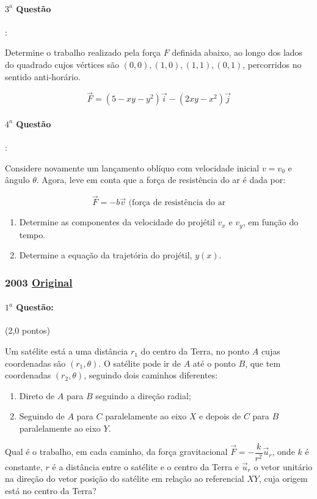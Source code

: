 \documentclass[12pt,a4paper]{article}
\newcommand{\original}[1]{\tiny \href{#1}{Original} \normalsize}
\begin{document}
\paragraph{$3^a$ Questão}:

Determine o trabalho realizado pela força $F$ definida abaixo, ao longo dos lados do quadrado cujos vértices são $(0,0),(1,0),(1,1),(0,1)$, percorridos no sentido anti-horário.

$$ \overrightarrow{F}= (5-xy-y^2)\overrightarrow{i}-(2xy-x^2)\overrightarrow{j}$$

\paragraph{$4^a$ Questão}:

Considere novamente um lançamento oblíquo com velocidade inicial $v=v_0$ e ângulo $\theta$. Agora, leve em conta que a força de resistência do ar é dada por:

$$ \overrightarrow{F}=-b\overrightarrow{v} \textrm{ (força de resistência do ar} $$

\begin{enumerate}[label=\alph*)]
\item Determine as componentes da velocidade do projétil $v_x$ e $v_y$, em função do tempo.
\item Determine a equação da trajetória do projétil, $y(x)$.
\end{enumerate}
\newpage

\subsubsection{2003 \original{https://drive.google.com/file/d/1DHYVV8VAxas7WYdZjn7KfkgFQ6bv0rQq/view?usp=sharing}}

\paragraph{$1^a$ Questão:} (2,0 pontos)

Um satélite está a uma distância $r_1$ do centro da Terra, no ponto $A$ cujas coordenadas são $(r_1,\theta)$. O satélite
pode ir de $A$ até o ponto $B$, que tem coordenadas $(r_2,\theta)$, seguindo dois caminhos diferentes:
\begin{enumerate}[label=\roman*)]
\item Direto de $A$ para $B$ seguindo a direção radial;
\item Seguindo de $A$ para $C$ paralelamente ao eixo $X$ e depois de $C$ para $B$ paralelamente ao eixo $Y$.  
\end{enumerate}
Qual é o trabalho, em cada caminho, da força gravitacional $\overrightarrow{F}=-\dfrac{k}{r^2}\overrightarrow{u}_r$, onde 
$k$ é constante, $r$ é a distância entre o satélite e o centro da Terra e $\overrightarrow{u}_r$ o vetor unitário na direção 
do vetor posição do satélite em relação ao referencial $XY$, cuja origem está no centro da Terra?
\end{document}
